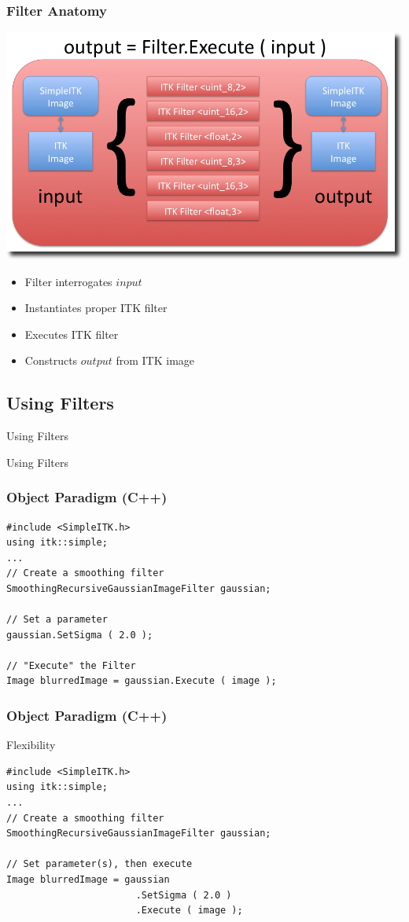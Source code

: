 \begin{frame}[fragile]
\frametitle{Filter Anatomy}
\begin{center}
  \includegraphics[width=.8\textwidth]{Images/FilterInternals_shadow}
\end{center}
\begin{itemize}
  \item Filter interrogates $input$
  \item Instantiates proper ITK filter
  \item Executes ITK filter
  \item Constructs $output$ from ITK image
\end{itemize}
\end{frame}

\subsection{Using Filters}
\begin{frame}{Using Filters}
\fontsize{36pt}{36pt}\selectfont
\center
\begin{center}
Using Filters
\end{center}
\end{frame}

\begin{frame}[fragile]
\frametitle{Object Paradigm (C++)}
\lstcpp
\begin{lstlisting}
#include <SimpleITK.h>
using itk::simple;
...
// Create a smoothing filter
SmoothingRecursiveGaussianImageFilter gaussian;

// Set a parameter
gaussian.SetSigma ( 2.0 );

// "Execute" the Filter
Image blurredImage = gaussian.Execute ( image );
\end{lstlisting}
\end{frame}

\begin{frame}[fragile]
\frametitle{Object Paradigm (C++)}
Flexibility
\lstcpp
\begin{lstlisting}
#include <SimpleITK.h>
using itk::simple;
...
// Create a smoothing filter
SmoothingRecursiveGaussianImageFilter gaussian;

// Set parameter(s), then execute
Image blurredImage = gaussian
                       .SetSigma ( 2.0 )
                       .Execute ( image );
\end{lstlisting}
\end{frame}

